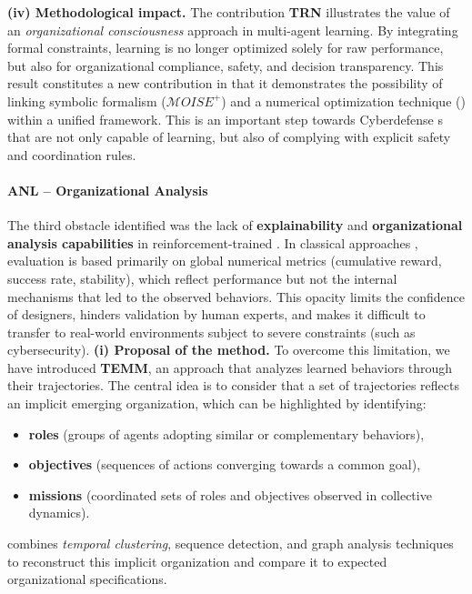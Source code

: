\medskip
\noindent
\textbf{(iv) Methodological impact.}
The contribution \textbf{TRN} illustrates the value of an \textit{organizational consciousness} approach in multi-agent learning.
By integrating formal constraints, learning is no longer optimized solely for raw performance, but also for organizational compliance, safety, and decision transparency.
This result constitutes a new contribution in that it demonstrates the possibility of linking symbolic formalism ($\mathcal{M}OISE^+$) and a numerical optimization technique () within a unified framework.
This is an important step towards Cyberdefense s that are not only capable of learning, but also of complying with explicit safety and coordination rules.
\paragraph{ANL – Organizational Analysis}
The third obstacle identified was the lack of \textbf{explainability} and \textbf{organizational analysis capabilities} in reinforcement-trained .
In classical  approaches , evaluation is based primarily on global numerical metrics (cumulative reward, success rate, stability), which reflect performance but not the internal mechanisms that led to the observed behaviors.
This opacity limits the confidence of designers, hinders validation by human experts, and makes it difficult to transfer to real-world environments subject to severe constraints (such as cybersecurity).
\medskip
\noindent
\textbf{(i) Proposal of the  method.}
To overcome this limitation, we have introduced \textbf{TEMM}, an approach that analyzes learned behaviors through their trajectories.
The central idea is to consider that a set of trajectories reflects an implicit emerging organization, which can be highlighted by identifying:
\begin{itemize}
  \item \textbf{roles} (groups of agents adopting similar or complementary behaviors),
  \item \textbf{objectives} (sequences of actions converging towards a common goal),
  \item \textbf{missions} (coordinated sets of roles and objectives observed in collective dynamics).
        \end {itemize}
         combines \textit{temporal clustering}, sequence detection, and graph analysis techniques to reconstruct this implicit organization and compare it to expected organizational specifications.
